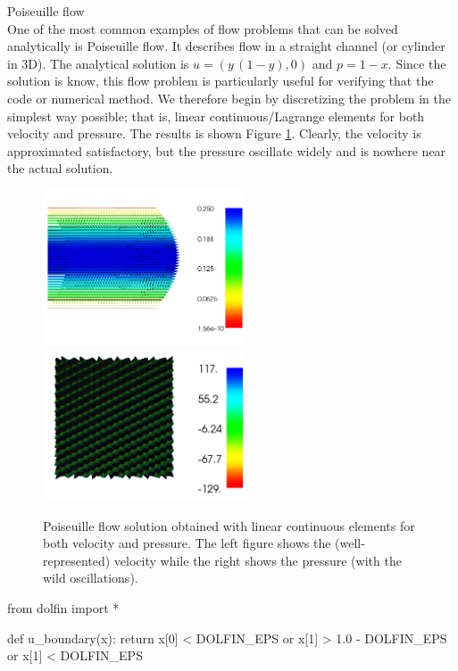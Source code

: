 \begin{example}{Poiseuille flow} \\
One of the most common examples of flow problems that can be solved
analytically is Poiseuille flow. It describes flow in a straight
channel (or cylinder in 3D).  The analytical solution is $u=(y\,
(1-y), 0)$ and $p = 1-x$.  Since the solution is know, this flow
problem is particularly useful for verifying that the code or
numerical method. We therefore begin by discretizing the problem in
the simplest way possible; that is, linear continuous/Lagrange elements
for both velocity and pressure. The results is shown Figure
\ref{fig:stokes1}. Clearly, the velocity is approximated satisfactory,
but the pressure oscillate widely and is nowhere near the actual
solution.
\begin{figure}
\begin{center}
\includegraphics[width=6cm]{chapters/Stokes_problem/plots/stokes_velocity.png}
\includegraphics[width=6cm]{chapters/Stokes_problem/plots/stokes_pressure_instabilities.png}
\caption{Poiseuille flow solution obtained with linear continuous elements for
both velocity and pressure. The left figure shows the (well-represented) velocity while the right shows
the pressure (with the wild oscillations).}
\label{fig:stokes1}
\end{center}
\end{figure}

\begin{python}
from dolfin import *

def u_boundary(x):
  return x[0] < DOLFIN_EPS or x[1] > 1.0 - DOLFIN_EPS or x[1] < DOLFIN_EPS


\end{python}
\end{example}
